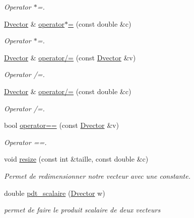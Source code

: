 \begin{DoxyCompactItemize}
\begin{DoxyCompactList}\small\item\em Operator $\ast$=. \end{DoxyCompactList}\item 
\hyperlink{classDvector}{Dvector} \& \hyperlink{classDvector_a0b19a08b86a8727f40d00dace8ace639}{operator$\ast$=} (const double \&c)
\begin{DoxyCompactList}\small\item\em Operator $\ast$=. \end{DoxyCompactList}\item 
\hyperlink{classDvector}{Dvector} \& \hyperlink{classDvector_a7698c539c6c001639df1a01ea62e0d85}{operator/=} (const \hyperlink{classDvector}{Dvector} \&v)
\begin{DoxyCompactList}\small\item\em Operator /=. \end{DoxyCompactList}\item 
\hyperlink{classDvector}{Dvector} \& \hyperlink{classDvector_ac4c5f6c7fb7b4f34f080b3c8c77b0943}{operator/=} (const double \&c)
\begin{DoxyCompactList}\small\item\em Operator /=. \end{DoxyCompactList}\item 
bool \hyperlink{classDvector_ad5e212597ae0d0bcbb0bf6678b9b4aa9}{operator==} (const \hyperlink{classDvector}{Dvector} \&v)
\begin{DoxyCompactList}\small\item\em Operator ==. \end{DoxyCompactList}\item 
void \hyperlink{classDvector_a774377bf2c62ca9d51fcf198a7c82839}{resize} (const int \&taille, const double \&c)
\begin{DoxyCompactList}\small\item\em Permet de redimensionner notre vecteur avec une constante. \end{DoxyCompactList}\item 
double \hyperlink{classDvector_a56e10051db695ea7f8aaf3079ea45472}{pdt\-\_\-scalaire} (\hyperlink{classDvector}{Dvector} w)
\begin{DoxyCompactList}\small\item\em permet de faire le produit scalaire de deux vecteurs \end{DoxyCompactList}\end{DoxyCompactItemize}


